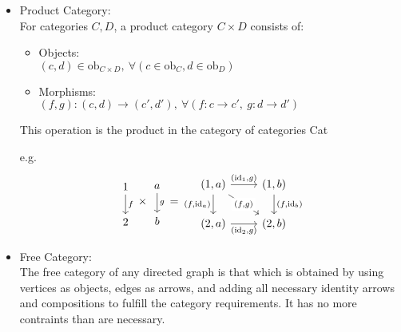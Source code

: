 \begin{itemize}
  \item Product Category:\\
    For categories $C,D$, a product category $C\times D$ consists of:
    \parencite{awodey:category_theory}
    \begin{itemize}
      \item Objects:\\
        $(c, d) \in \mathrm{ob}_{C\times D},\ \forall (c \in \mathrm{ob}_C, d \in \mathrm{ob}_D)$
      \item Morphisms:\\
        $(f,g) : (c,d) \to (c', d'),\ \forall (f: c \to c',\ g:d \to d')$
    \end{itemize}
    This operation is the product in the category of categories Cat

    e.g.
    \[
    \begin{tikzcd}
      1 \\
      2
      \arrow["f", from=1-1, to=2-1]
    \end{tikzcd}
    \times
    \begin{tikzcd}
      a \\
      b
      \arrow["g", from=1-1, to=2-1]
    \end{tikzcd}
    =
    \begin{tikzcd}
      {(1,a)} & {(1,b)} \\
      {(2,a)} & {(2,b)}
      \arrow["{(\mathrm{id}_1,g)}", from=1-1, to=1-2]
      \arrow["{(f,\mathrm{id}_a)}"', from=1-1, to=2-1]
      \arrow["{(\mathrm{id}_2,g)}"', from=2-1, to=2-2]
      \arrow["{(f,\mathrm{id}_b)}", from=1-2, to=2-2]
      \arrow["{(f,g)}"{description}, from=1-1, to=2-2]
    \end{tikzcd}
    \]
  \item Free Category:\\
    The free category of any directed graph is that which is obtained by using
    vertices as objects, edges as arrows, and adding all necessary identity
    arrows and compositions to fulfill the category requirements. It has no
    more contraints than are necessary.


\end{itemize}
